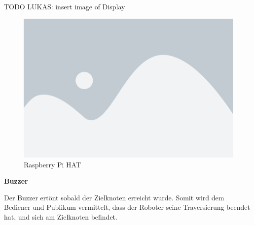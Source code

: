 TODO LUKAS: insert image of Display
\begin{figure}[H]
    \centering
    \includegraphics[width=0.5\linewidth]{assets/placeholder.png}
    \caption{Raspberry Pi HAT}
    \label{fig:raspiheader-display}
\end{figure}


\textbf{Buzzer}\label{peripherie-buzzer}

Der Buzzer ertönt sobald der Zielknoten erreicht wurde. Somit wird dem Bediener und Publikum vermittelt, dass der Roboter seine Traversierung beendet hat, und sich am Zielknoten befindet.
